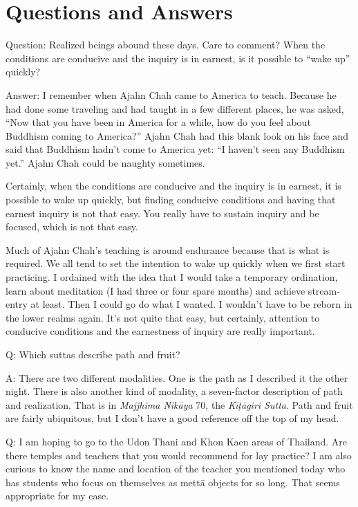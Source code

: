 \chapter{Questions and Answers}

\vspace{\the\qaskip}
Question: Realized beings abound these days. Care to comment? When the
conditions are conducive and the inquiry is in earnest, is it possible
to “wake up” quickly?

\vspace{\the\qaskip}
Answer: I remember when Ajahn Chah came to America to teach. Because he
had done some traveling and had taught in a few different places, he was
asked, “Now that you have been in America for a while, how do you feel
about Buddhism coming to America?” Ajahn Chah had this blank look on his
face and said that Buddhism hadn’t come to America yet: “I haven’t seen
any Buddhism yet.” Ajahn Chah could be naughty sometimes.

Certainly, when the conditions are conducive and the inquiry is in
earnest, it is possible to wake up quickly, but finding conducive
conditions and having that earnest inquiry is not that easy. You really
have to sustain inquiry and be focused, which is not that easy.

Much of Ajahn Chah’s teaching is around endurance because that is what
is required. We all tend to set the intention to wake up quickly when we
first start practicing. I ordained with the idea that I would take a
temporary ordination, learn about meditation (I had three or four spare
months) and achieve stream-entry at least. Then I could go do what I
wanted. I wouldn’t have to be reborn in the lower realms again. It’s not
quite that easy, but certainly, attention to conducive conditions and
the earnestness of inquiry are really important.

\vspace{\the\qaskip}
Q: Which suttas describe path and fruit?

\vspace{\the\qaskip}
A: There are two different modalities. One is the path as I described it
the other night. There is also another kind of modality, a seven-factor
description of path and realization. That is in \emph{Majjhima Nikāya}
70, the \emph{Kīṭāgiri Sutta}. Path and fruit are fairly ubiquitous, but
I don’t have a good reference off the top of my head.

\vspace{\the\qaskip}
Q: I am hoping to go to the Udon Thani and Khon Kaen areas of Thailand.
Are there temples and teachers that you would recommend for lay
practice? I am also curious to know the name and location of the teacher
you mentioned today who has students who focus on themselves as mettā
objects for so long. That seems appropriate for my case.

